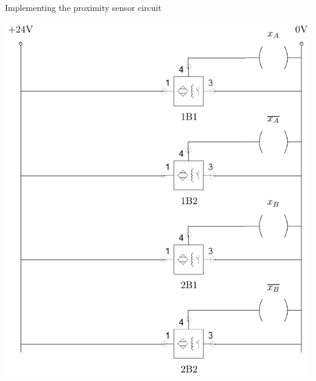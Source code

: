 \documentclass[presentation,aspectratio=1610]{beamer}
\begin{document}
\begin{frame}[label={sec:org3b703b1}]{Implementing the proximity sensor circuit}
\begin{center}
\includegraphics[height=0.9\textheight]{sensor-circuit}
\end{center}
\end{frame}
\end{document}
